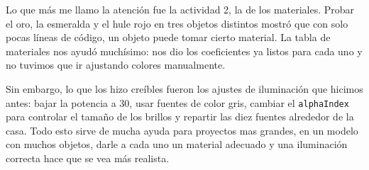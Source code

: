 Lo que más me llamo la atención fue la actividad 2, la de los materiales. Probar el oro, la esmeralda y el hule rojo en tres objetos distintos mostró que con solo pocas líneas de código, un objeto puede tomar cierto material. La tabla de materiales nos ayudó muchísimo: nos dio los coeficientes ya listos para cada uno y no tuvimos que ir ajustando colores manualmente.

Sin embargo, lo que los hizo creíbles fueron los ajustes de iluminación que hicimos antes: bajar la potencia a 30, usar fuentes de color gris, cambiar el \texttt{alphaIndex} para controlar el tamaño de los brillos y repartir las diez fuentes alrededor de la casa. Todo esto sirve de mucha ayuda para proyectos mas grandes, en un modelo con muchos objetos, darle a cada uno un material adecuado y una iluminación correcta hace que se vea más realista.
